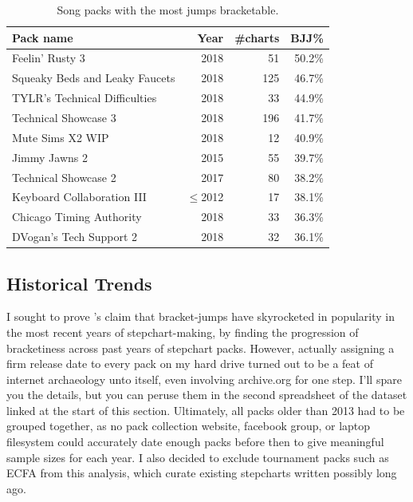 \documentclass[10pt]{sigplanconf}
\begin{document}
\begin{table}[t]
	\begin{center}
		\small
	\begin{tabular}{l|r|r|r}
		\bf Pack name & \bf Year & \bf \#charts & \bf BJJ\% \\
		\hline
		Feelin' Rusty 3			& 2018	&  51 & 50.2\% \\
		Squeaky Beds and Leaky Faucets	& 2018	& 125 & 46.7\% \\
		TYLR's Technical Difficulties	& 2018	&  33 & 44.9\% \\
		Technical Showcase 3		& 2018	& 196 & 41.7\% \\
		Mute Sims X2 WIP		& 2018	&  12 & 40.9\% \\
		Jimmy Jawns 2			& 2015	&  55 & 39.7\% \\
		Technical Showcase 2		& 2017	&  80 & 38.2\% \\
		Keyboard Collaboration III	& $\le$2012	&  17 & 38.1\% \\
		Chicago Timing Authority	& 2018	&  33 & 36.3\% \\
		DVogan's Tech Support 2		& 2018	&  32 & 36.1\% \\
	\end{tabular}
	\end{center}
	\caption{Song packs with the most jumps bracketable.}
	\label{tab:pack-bjj}
\end{table}

\subsection{Historical Trends}
\label{sec:eval-years}

I sought to prove \cite{dril}'s claim that bracket-jumps have skyrocketed in popularity in the most recent years of stepchart-making,
by finding the progression of bracketiness across past years of stepchart packs.
However,
actually assigning a firm release date to every pack on my hard drive turned out to be a feat of internet archaeology unto itself,
even involving archive.org for one step.
I'll spare you the details, but you can peruse them in the second spreadsheet of the dataset linked at the start of this section.
Ultimately, all packs older than 2013 had to be grouped together,
as no pack collection website, facebook group, or laptop filesystem could accurately date enough packs
before then to give meaningful sample sizes for each year.
I also decided to exclude tournament packs such as ECFA from this analysis,
which curate existing stepcharts written possibly long ago.
\end{document}
